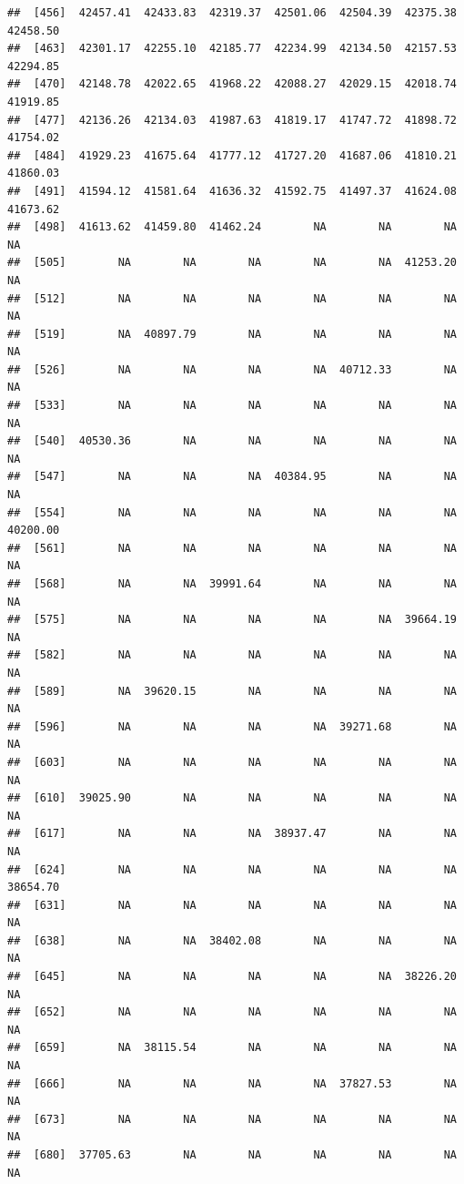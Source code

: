 \documentclass[
]{article}
\begin{document}
\begin{verbatim}
##  [456]  42457.41  42433.83  42319.37  42501.06  42504.39  42375.38  42458.50
##  [463]  42301.17  42255.10  42185.77  42234.99  42134.50  42157.53  42294.85
##  [470]  42148.78  42022.65  41968.22  42088.27  42029.15  42018.74  41919.85
##  [477]  42136.26  42134.03  41987.63  41819.17  41747.72  41898.72  41754.02
##  [484]  41929.23  41675.64  41777.12  41727.20  41687.06  41810.21  41860.03
##  [491]  41594.12  41581.64  41636.32  41592.75  41497.37  41624.08  41673.62
##  [498]  41613.62  41459.80  41462.24        NA        NA        NA        NA
##  [505]        NA        NA        NA        NA        NA  41253.20        NA
##  [512]        NA        NA        NA        NA        NA        NA        NA
##  [519]        NA  40897.79        NA        NA        NA        NA        NA
##  [526]        NA        NA        NA        NA  40712.33        NA        NA
##  [533]        NA        NA        NA        NA        NA        NA        NA
##  [540]  40530.36        NA        NA        NA        NA        NA        NA
##  [547]        NA        NA        NA  40384.95        NA        NA        NA
##  [554]        NA        NA        NA        NA        NA        NA  40200.00
##  [561]        NA        NA        NA        NA        NA        NA        NA
##  [568]        NA        NA  39991.64        NA        NA        NA        NA
##  [575]        NA        NA        NA        NA        NA  39664.19        NA
##  [582]        NA        NA        NA        NA        NA        NA        NA
##  [589]        NA  39620.15        NA        NA        NA        NA        NA
##  [596]        NA        NA        NA        NA  39271.68        NA        NA
##  [603]        NA        NA        NA        NA        NA        NA        NA
##  [610]  39025.90        NA        NA        NA        NA        NA        NA
##  [617]        NA        NA        NA  38937.47        NA        NA        NA
##  [624]        NA        NA        NA        NA        NA        NA  38654.70
##  [631]        NA        NA        NA        NA        NA        NA        NA
##  [638]        NA        NA  38402.08        NA        NA        NA        NA
##  [645]        NA        NA        NA        NA        NA  38226.20        NA
##  [652]        NA        NA        NA        NA        NA        NA        NA
##  [659]        NA  38115.54        NA        NA        NA        NA        NA
##  [666]        NA        NA        NA        NA  37827.53        NA        NA
##  [673]        NA        NA        NA        NA        NA        NA        NA
##  [680]  37705.63        NA        NA        NA        NA        NA        NA

\end{verbatim}
\end{document}
